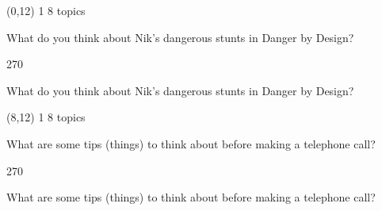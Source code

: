\documentclass[a4paper]{article}
\newenvironment{itemize*}%
{\begin{itemize}%
 \setlength{\itemsep}{0.5cm}%
 \setlength{\parsep}{0pt}%
 \setlength{\parskip}{0pt}}%
{\end{itemize}}
\newcommand{\mycard}[3]{%
	\small #1 #2
	\par
	\parbox[t][6.8cm][c]{9.5cm}{%
	\par
	\myleft{#3}
	\par
	\myright{#3}
	}
}
\newcommand{\myleft}[1]{%
	\begin{sideways}
	\hspace*{-0.9cm}
		\parbox[t][2.7cm][t]{6.5cm}{%
		\large #1
		}
	\end{sideways}
}
\newcommand{\myright}[1]{%
	\hspace*{6.5cm}
	\begin{turn}{270}
	\hspace*{-7.1cm}
		\parbox[t][2.7cm][t]{6.5cm}{%
		\large #1
		}
	\end{turn}
}
\begin{document}
\begin{textblock}{8}(0,12)
\mycard{1}{8 topics}{
\begin{itemize*}
\item What do you think about Nik's dangerous stunts in Danger by Design?
\end{itemize*}
}
\end{textblock}

\begin{textblock}{8}(8,12)
\mycard{1}{8 topics}{
\begin{itemize*}
\item What are some tips (things) to think about before making a telephone call?
\end{itemize*}
}
\end{textblock}

\null
\newpage
\end{document}
